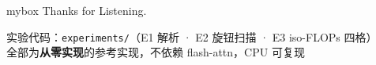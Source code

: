 \documentclass[10pt,aspectratio=169,mathserif]{beamer}
\begin{document}
\section*{}
\begin{frame}
  \begin{center}
    \begin{minipage}{1\textwidth}
      \begin{beamercolorbox}[wd=0.70\textwidth, rounded=true, shadow=true]{mybox}
      \LARGE \centering Thanks for Listening.
      \end{beamercolorbox}
    \end{minipage}
  \end{center}

  \vspace{0.6em}
  \begin{center}
    \small
    实验代码：\texttt{experiments/}（E1 解析 · E2 旋钮扫描 · E3 iso-FLOPs 四格）\\
    全部为\textbf{从零实现}的参考实现，不依赖 flash-attn，CPU 可复现
  \end{center}
\end{frame}
\end{document}
